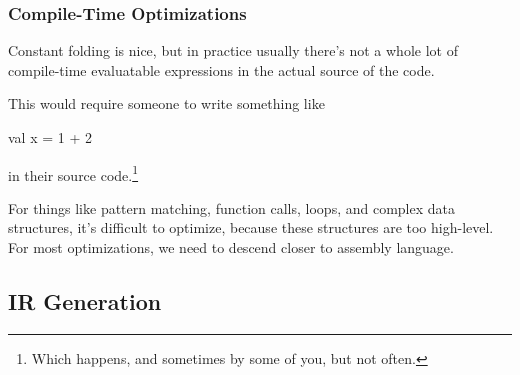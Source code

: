 \documentclass[aspectratio=169, handout]{beamer}
\begin{document}
\begin{frame}[fragile]
  \frametitle{Compile-Time Optimizations}

  Constant folding is nice, but in practice usually there's not a whole lot of
  compile-time evaluatable expressions in the actual source of the code.

  \pause
  \vspace{\fill}

  This would require someone to write something like
  \begin{codeblock}
    val x = 1 + 2
  \end{codeblock}
  in their source code.\footnote<2->{Which happens, and sometimes by some of you,
  but not often.}

  \pause
  \vspace{\fill}

  For things like pattern matching, function calls, loops, and complex
  data structures, it's difficult to optimize, because these structures are
  too high-level. For most optimizations, we need to descend closer to assembly
  language.
\end{frame}

\subsection{\color{presentColor}IR Generation}
\end{document}
